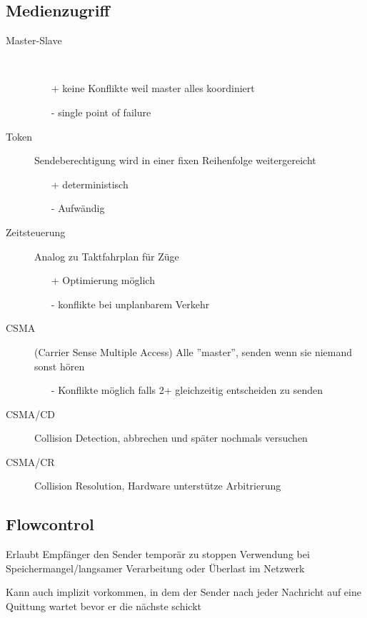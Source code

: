 \subsection{Medienzugriff}
\begin{description}
	\item[Master-Slave] \,
        \begin{itemize}
            \item[+] keine Konflikte weil master alles koordiniert
            \item[-] single point of failure
		\end{itemize}
	\item[Token] Sendeberechtigung wird in einer fixen Reihenfolge weitergereicht
        \begin{itemize}
            \item[+] deterministisch
            \item[-] Aufwändig
		\end{itemize}
	\item[Zeitsteuerung] Analog zu Taktfahrplan für Züge
        \begin{itemize}
            \item[+] Optimierung möglich
            \item[-] konflikte bei unplanbarem Verkehr
		\end{itemize}
	\item[CSMA] (Carrier Sense Multiple Access) Alle ''master'', senden wenn sie niemand
        sonst hören
        \begin{itemize}
            \item[-] Konflikte möglich falls 2+ gleichzeitig entscheiden zu senden
		\end{itemize}
	\item[CSMA/CD] Collision Detection, abbrechen und später nochmals versuchen
    \item[CSMA/CR] Collision Resolution, Hardware unterstütze Arbitrierung
\end{description}

\subsection{Flowcontrol}

Erlaubt Empfänger den Sender temporär zu stoppen
Verwendung bei Speichermangel/langsamer Verarbeitung oder Überlast im Netzwerk

Kann auch implizit vorkommen, in dem der Sender nach jeder Nachricht auf eine
Quittung wartet bevor er die nächste schickt




